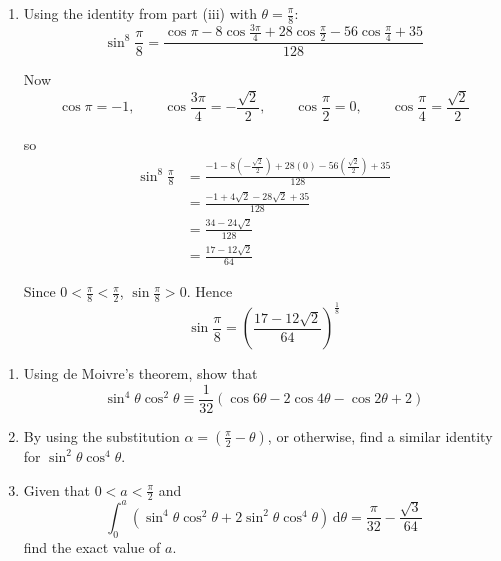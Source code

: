 \documentclass[leqno]{article}
\begin{document}
\begin{enumerate}[
  label=\textbf{\arabic*.},
  leftmargin=*,
  topsep=0pt,
  partopsep=0pt,
  parsep=0pt
]
\begin{djsSolution}
\begin{enumerate}[label=\textbf{(\roman*)}]
  So
  \[
  P=\frac{1}{128},\quad Q=-\frac{1}{16},\quad R=\frac{7}{32},\quad S=-\frac{7}{16},\quad T=\frac{35}{128}
  \]

  Equivalently
  \[
  \sin^8\theta\equiv \frac{\cos 8\theta-8\cos 6\theta+28\cos 4\theta-56\cos 2\theta+35}{128}
  \]

  \item Using the identity from part (iii) with \(\theta=\frac{\pi}{8}\):
  \[
  \sin^8\frac{\pi}{8}
  =\frac{\cos\pi-8\cos\frac{3\pi}{4}+28\cos\frac{\pi}{2}-56\cos\frac{\pi}{4}+35}{128}
  \]

  Now
  \[
  \cos\pi=-1,\qquad \cos\frac{3\pi}{4}=-\frac{\sqrt2}{2},\qquad \cos\frac{\pi}{2}=0,\qquad \cos\frac{\pi}{4}=\frac{\sqrt2}{2}
  \]

  so
  \begin{align*}
  \sin^8\frac{\pi}{8}
  &=\frac{-1-8\left(-\frac{\sqrt2}{2}\right)+28(0)-56\left(\frac{\sqrt2}{2}\right)+35}{128} \\
  &=\frac{-1+4\sqrt2-28\sqrt2+35}{128} \\
  &=\frac{34-24\sqrt2}{128} \\
  &=\frac{17-12\sqrt2}{64}
  \end{align*}

  Since \(0<\frac{\pi}{8}<\frac{\pi}{2}\), \(\sin\frac{\pi}{8}>0\). Hence
  \[
  \sin \frac{\pi}{8}=\left(\frac{17-12\sqrt{2}}{64}\right)^{\frac{1}{8}}
  \]
\end{enumerate}
\end{djsSolution}


\newpage

\questionitem

\begin{enumerate}[label=\textbf{(\alph*)}]
  \item Using de Moivre's theorem, show that
  \[
  \sin^4\theta\cos^2\theta \equiv \frac{1}{32}(\cos 6\theta - 2\cos 4\theta - \cos 2\theta + 2)
  \]
  \item By using the substitution $\alpha=\left(\frac{\pi}{2}-\theta\right)$, or otherwise, find a similar identity for $\sin^2\theta\cos^4\theta$.  \\
  \item Given that $0<a<\frac{\pi}{2}$ and
  \[
  \int_0^a \left(\sin^4\theta\cos^2\theta + 2\sin^2\theta\cos^4\theta\right)\,\mathrm{d}\theta = \frac{\pi}{32} - \frac{\sqrt{3}}{64}
  \]
  find the exact value of $a$.  \\
\end{enumerate}


\end{enumerate}
\end{document}
